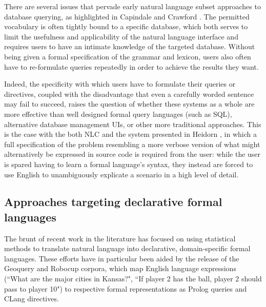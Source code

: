 \documentclass[a4paper,11pt]{proposal}
\begin{document}
There are several issues that pervade early natural language subset approaches to database querying, as highlighted in Capindale and Crawford \cite{capindale1990}. The permitted vocabulary is often tightly bound to a specific database, which both serves to limit the usefulness and applicability of the natural language interface and requires users to have an intimate knowledge of the targeted database. Without being given a formal specification of the grammar and lexicon, users also often have to re-formulate queries repeatedly in order to achieve the results they want. 

Indeed, the specificity with which users have to formulate their queries or directives, coupled with the disadvantage that even a carefully worded sentence may fail to succeed, raises the question of whether these systems as a whole are more effective than well designed formal query languages (such as SQL), alternative database management UIs, or other more traditional approaches. This is the case with the both NLC and the system presented in Heidorn \cite{heidorn1974}, in which a full specification of the problem resembling a more verbose version of what might alternatively be expressed in source code is required from the user: while the user is spared having to learn a formal language's syntax, they instead are forced to use English to unambiguously explicate a scenario in a high level of detail.

\subsection{Approaches targeting declarative formal languages}

The brunt of recent work in the literature has focused on using statistical methods to translate natural language into declarative, domain-specific formal languages. These efforts have in particular been aided by the release of the Geoquery \cite{zelle1995} and Robocup \cite{kuhlmann2004} corpora, which map English language expressions (``What are the major cities in Kansas?", ``If player 2 has the ball, player 2 should pass to player 10") to respective formal representations as Prolog queries and CLang directives.
\end{document}
